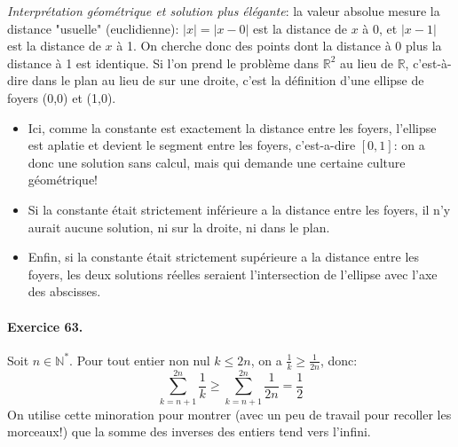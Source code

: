 \textit{Interprétation géométrique et solution plus élégante}: la valeur absolue mesure la distance "usuelle" (euclidienne): $|x|=|x-0|$ est la distance de $x$ à 0, et $|x-1|$ est la distance de $x$ à 1. On cherche donc des points dont la distance à 0 plus la distance à 1 est identique. Si l'on prend le problème dans $\mathbb{R}^2$ au lieu de $\mathbb{R}$, c'est-à-dire dans le plan au lieu de sur une droite, c'est la définition d'une ellipse de foyers (0,0) et (1,0).
\begin{itemize}
  \item Ici, comme la constante est exactement la distance entre les foyers, l'ellipse est aplatie et devient le segment entre les foyers, c'est-a-dire $[0,1]$: on a donc une solution sans calcul, mais qui demande une certaine culture géométrique!
  \item Si la constante était strictement inférieure a la distance entre les foyers, il n'y aurait aucune solution, ni sur la droite, ni dans le plan. 
  \item Enfin, si la constante était strictement supérieure a la distance entre les foyers, les deux solutions réelles seraient l'intersection de l'ellipse avec l'axe des abscisses.%
\end{itemize}

\paragraph{Exercice 63.} Soit $n\in\mathbb{N}^*$. Pour tout entier non nul $k\leq 2n$, on a $\frac{1}{k}\geq \frac{1}{2n}$, donc:
\[
\sum_{k=n+1}^{2n}{\frac{1}{k}}\geq \sum_{k=n+1}^{2n}{\frac{1}{2n}}=\frac{1}{2}
\]
On utilise cette minoration pour montrer (avec un peu de travail pour recoller les morceaux!) que la somme des inverses des entiers tend vers l'infini.
